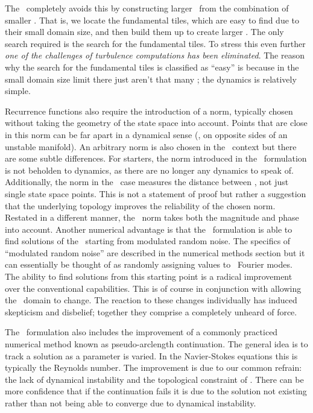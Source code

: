 The \spt\ completely avoids this by constructing larger \twots\
from the combination of smaller \twots. That is,
we locate the fundamental tiles, which are easy to find due to their small
domain size, and then build them up to create larger \twots. The only
search required is the search for the fundamental tiles. To stress
this even further \textit{one of the challenges of turbulence
computations has been eliminated}. The reason
why the search for the fundamental tiles is classified as ``easy'' is because
in the small domain size limit there just aren't that many \twots; the dynamics
is relatively simple.

Recurrence functions also require the introduction of a norm,
typically chosen without taking the geometry of the state space into account.
Points that are close in this norm can be far apart in a dynamical sense (\ie, on opposite sides
of an unstable manifold). An arbitrary norm is also chosen in the \spt\
context but there are some subtle differences. For starters, the
norm introduced in the \spt\ formulation is not beholden to dynamics, as
there are no longer any dynamics to speak of.
Additionally, the norm in the \spt\ case measures the distance between \twots,
not just single state space points. This is not a statement of proof but rather
a suggestion that the underlying topology improves the reliability of
the chosen norm. Restated in a different manner, the \spt\ norm
takes both the magnitude and phase into account.
Another numerical advantage is that the \spt\ formulation is able to find solutions
of the \KSe\ starting from modulated random noise. The specifics
of ``modulated random noise'' are described in the numerical methods section
but it can essentially be thought of as randomly assigning values to \spt\
Fourier modes. The ability to find solutions from this starting point
is a radical improvement over the conventional capabilities. This is of course
in conjunction with allowing the \spt\ domain to change. The reaction to these
changes individually has induced skepticism and disbelief; together they comprise
a completely unheard of force.

The \spt\ formulation also includes the improvement of a commonly
practiced numerical method known as pseudo-arclength continuation.
The general idea is to track a solution as a parameter is varied. In the
Navier-Stokes equations this is typically the Reynolds number.
The improvement is due to our common refrain: the lack of dynamical
instability and the topological constraint of \twots. There can
be more confidence that if the continuation fails it is due to the solution
not existing rather than not being able to converge due to dynamical instability.
